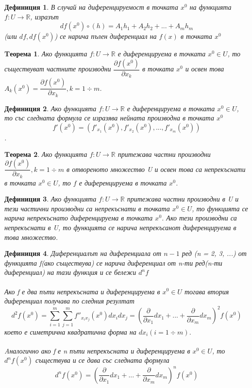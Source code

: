 \documentclass[a4paper,fleqn,12pt]{article}
\newtheorem{theorem}{Tеорема}[subsection]
\newtheorem{definition}{Дефиниция}[subsection]
\theoremstyle{definition}
\begin{document}
\begin{definition}
В случай на диференцируемост в точката $x^0$ на функцията $f: U \to \mathbb{R}$, изразът 
$$df(x^0) \circ (h) = A_1 h_1 + A_2 h_2 + ... + A_m h_m$$
(или $df, df(x^0)$) се нарича пълен диференциал на $f(x)$ в точката $x^0$
\end{definition}

\begin{theorem}
Ако функцията $f: U \to \mathbb{R}$ е диференцируема в точката $x^0 \in U$, то съществуват частните производни $\dfrac{\partial f(x^0)}{\partial x_k}$ в точката $x^0$ и освен това $A_k(x^0) = \dfrac{\partial f(x^0)}{\partial x_k}, k = 1 \div m$.
\end{theorem}

\begin{definition}
Ако функцията $f: U \to \mathbb{R}$ е диференцируема в точката $x^0 \in U$, то със следната формула се изразява нейната производна в точката $x^0$
$$f'(x^0) = (f'_{x_1}(x^0), f'_{x_2}(x^0), ..., f'_{x_m}(x^0))$$.

\end{definition}

\begin{theorem}
Ако функцията $f: U \to \mathbb{R}$ притежава частни производни $\dfrac{\partial f(x^0)}{\partial x_k}, k = 1 \div m$ в отвореното множество U и освен това са непрекъснати в точката $x^0 \in U$, то $f$ е диференцируема в точката $x^0$.
\end{theorem}

\begin{definition}
Ако функцията $f: U \to \mathbb{R}$ притежава частни производни в U и тези частични производни са непрекъснати в точката $x^0 \in U$, то функцията се нарича непрекъснато диференцируема в точката $x^0$. Ако тези производни са непрекъснати в U, то функцията се нарича непрекъсанот диференцируема в това множество. 
\end{definition}

\begin{definition}
Диференциалът на диференциала от $n-1$ ред (n = 2, 3, ...) от функцията f(ако съществува) се нарича диференциал от n-ти ред(n-ти диференциал) на тази функция и се бележи $d^n f$\\
\\
Ако f е два пъти непрекъсната и диференцируема в $x^0 \in U$ тогава втория диференциал получава по следния резултат
$$d^2 f(x^0) = \sum_{i=1}^ m \sum_{j=1}^m f''_{x_i x_j}(x^0) dx_i dx_j = \left( \dfrac{\partial}{\partial x_1}dx_1 + ... + \dfrac{\partial}{\partial x_m}dx_m\right )^2 f(x^0)$$
което е симетрична квадратична форма на $dx_i (i = 1 \div m)$. \\
\\
Aналогично ако f е n пъти непрекъсната и диференцируема в $x^0 \in U$, то $d^n f(x^0)$ съществува и се дава със следната формула 
$$d^n f(x^0) = \left( \dfrac{\partial}{\partial x_1}dx_1 + ... + \dfrac{\partial}{\partial x_m}dx_m\right )^n f(x^0)$$
\end{definition}
\end{document}
